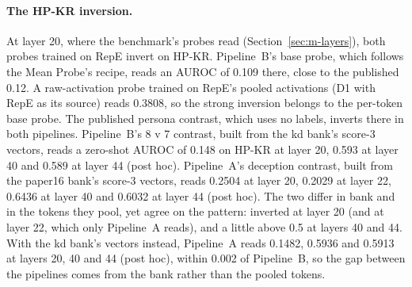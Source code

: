 \paragraph{The HP-KR inversion.} At layer 20, where the benchmark's probes read (Section~\ref{sec:m-layers}), both probes trained on RepE invert on HP-KR.
Pipeline~B's base probe, which follows the Mean Probe's recipe, reads an AUROC of 0.109 there, close to the published 0.12. %
A raw-activation probe trained on RepE's pooled activations (D1 with RepE as its source) reads 0.3808, so the strong inversion belongs to the per-token base probe. %
The published persona contrast, which uses no labels, inverts there in both pipelines. %
Pipeline~B's 8 v 7 contrast, built from the kd bank's score-3 vectors, reads a zero-shot AUROC of 0.148 on HP-KR at layer 20, 0.593 at layer 40 and 0.589 at layer 44 (post hoc). %
Pipeline~A's deception contrast, built from the paper16 bank's score-3 vectors, reads 0.2504 at layer 20, 0.2029 at layer 22, 0.6436 at layer 40 and 0.6032 at layer 44 (post hoc). %
The two differ in bank and in the tokens they pool, yet agree on the pattern: inverted at layer 20 (and at layer 22, which only Pipeline~A reads), and a little above 0.5 at layers 40 and 44. %
With the kd bank's vectors instead, Pipeline~A reads 0.1482, 0.5936 and 0.5913 at layers 20, 40 and 44 (post hoc), within 0.002 of Pipeline~B, so the gap between the pipelines comes from the bank rather than the pooled tokens. %
